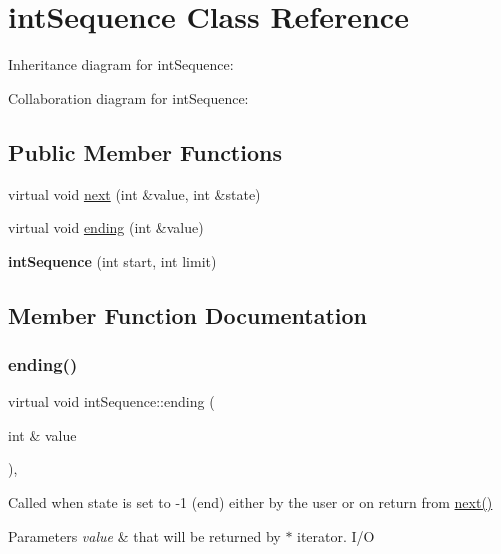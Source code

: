 \hypertarget{classintSequence}{}\section{int\+Sequence Class Reference}
\label{classintSequence}


Inheritance diagram for int\+Sequence\+:


Collaboration diagram for int\+Sequence\+:
\subsection*{Public Member Functions}
\begin{DoxyCompactItemize}
\item 
virtual void \hyperlink{classintSequence_ab624bfe357dcb3b34cb7091e4a254d4e}{next} (int \&value, int \&state)
\item 
virtual void \hyperlink{classintSequence_a4bf1fa808b4b4e4a5a618325d73df0c6}{ending} (int \&value)
\item 
\mbox{\label{classintSequence_a9d38989e2d03c5aa79ba815090fe582b}} 
{\bfseries int\+Sequence} (int start, int limit)
\end{DoxyCompactItemize}


\subsection{Member Function Documentation}
\mbox{\label{classintSequence_a4bf1fa808b4b4e4a5a618325d73df0c6}} 
\subsubsection{\texorpdfstring{ending()}{ending()}}
{\footnotesize\ttfamily virtual void int\+Sequence\+::ending (\begin{DoxyParamCaption}\item[{int \&}]{value }\end{DoxyParamCaption})\hspace{0.3cm}{\ttfamily [inline]}, {\ttfamily [virtual]}}

Called when state is set to -\/1 (end) either by the user or on return from \hyperlink{classintSequence_ab624bfe357dcb3b34cb7091e4a254d4e}{next()} 
\begin{DoxyParams}{Parameters}
{\em value} & that will be returned by $\ast$ iterator. I/O \\
\hline
\end{DoxyParams}



